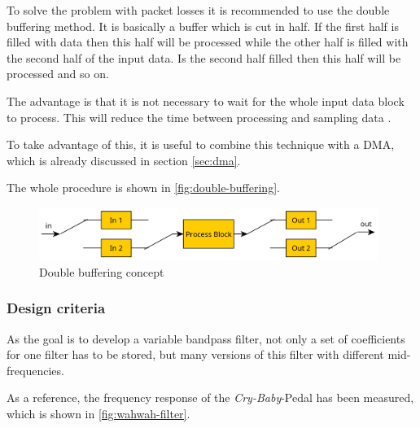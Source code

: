 To solve the problem with packet losses it is recommended to use the double buffering method.
It is basically a buffer which is cut in half. If the first half is filled with data then this half
will be processed while the other half is filled with the second half of the input data. Is the second
half filled then this half will be processed and so on.

The advantage is that it is not necessary to wait for the whole input data block to process.
This will reduce the time between processing and sampling data \cite{eetimes_fund_dsp}.

To take advantage of this, it is useful to combine this technique with a \ac{DMA},
which is already discussed in section \ref{sec:dma}.


The whole procedure is shown in \autoref{fig:double-buffering}.

\begin{figure}[!h]
    \centering
    \includegraphics[width=11cm]{img/double_buffering.PNG}
    \caption{Double buffering concept \cite{eetimes_fund_dsp}}
    \label{fig:double-buffering}
\end{figure}

\subsubsection{Design criteria}

As the goal is to develop a variable bandpass filter, not only a set of coefficients for one filter has to be stored,
but many versions of this filter with different mid-frequencies.

As a reference, the frequency response of the \textit{Cry-Baby}-Pedal has been measured, which is
shown in \autoref{fig:wahwah-filter}.

